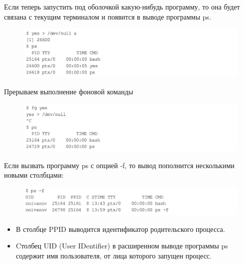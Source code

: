 \documentclass{beamer}
\begin{document}
\begin{frame}
Если теперь запустить под оболочкой какую-нибудь программу, то она будет связана с текущим терминалом и появится в выводе программы ps. 
\begin{figure}[h]
\centering
\includegraphics[scale=0.4]{images/lec07-pic23.png}
\end{figure}
Прерываем выполнение фоновой команды
\begin{figure}[h]
\centering
\includegraphics[scale=0.4]{images/lec07-pic24.png}
\end{figure}
\end{frame}

\begin{frame}
Если вызвать программу ps с опцией -f, то вывод пополнится несколькими новыми
столбцами: 
\begin{figure}[h]
\centering
\includegraphics[scale=0.4]{images/lec07-pic25.png}
\end{figure}
\begin{itemize}
\item В столбце PPID выводится идентификатор родительского процесса.
\item Cтолбец UID (User IDentifier) в расширенном выводе программы ps содержит
имя пользователя, от лица которого запущен процесс.
\end{itemize}
\end{frame}
\end{document}
